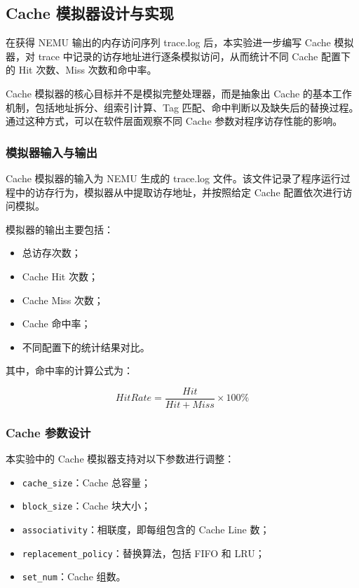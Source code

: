 \subsection{Cache 模拟器设计与实现}

在获得 NEMU 输出的内存访问序列 trace.log 后，本实验进一步编写 Cache 模拟器，对 trace 中记录的访存地址进行逐条模拟访问，从而统计不同 Cache 配置下的 Hit 次数、Miss 次数和命中率。

Cache 模拟器的核心目标并不是模拟完整处理器，而是抽象出 Cache 的基本工作机制，包括地址拆分、组索引计算、Tag 匹配、命中判断以及缺失后的替换过程。通过这种方式，可以在软件层面观察不同 Cache 参数对程序访存性能的影响。

\subsubsection{模拟器输入与输出}

Cache 模拟器的输入为 NEMU 生成的 trace.log 文件。该文件记录了程序运行过程中的访存行为，模拟器从中提取访存地址，并按照给定 Cache 配置依次进行访问模拟。

模拟器的输出主要包括：

\begin{itemize}
    \item 总访存次数；
    \item Cache Hit 次数；
    \item Cache Miss 次数；
    \item Cache 命中率；
    \item 不同配置下的统计结果对比。
\end{itemize}

其中，命中率的计算公式为：

\[
HitRate = \frac{Hit}{Hit + Miss} \times 100\%
\]

\subsubsection{Cache 参数设计}

本实验中的 Cache 模拟器支持对以下参数进行调整：

\begin{itemize}
    \item \texttt{cache\_size}：Cache 总容量；
    \item \texttt{block\_size}：Cache 块大小；
    \item \texttt{associativity}：相联度，即每组包含的 Cache Line 数；
    \item \texttt{replacement\_policy}：替换算法，包括 FIFO 和 LRU；
    \item \texttt{set\_num}：Cache 组数。
\end{itemize}

